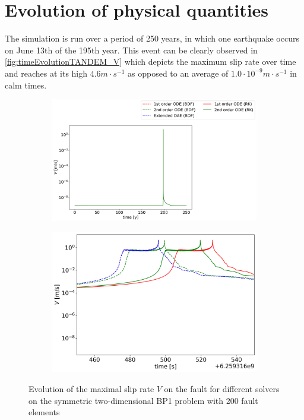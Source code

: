 \section{Evolution of physical quantities}
\label{sec:Results_EvolutionSlipRate}
The simulation is run over a period of 250 years, in which one earthquake occurs on June 13th of the 195th year. This event can be clearly observed in \autoref{fig:timeEvolutionTANDEM_V} which depicts the maximum slip rate over time and reaches at its high $4.6m\cdot s^{-1}$ as opposed to an average of $1.0 \cdot 10^{-9}m\cdot s^{-1}$ in calm times. 
\begin{figure}[H]
    \centering
    \begin{subfigure}[b]{0.45\textwidth}
     	\centering
    	\includegraphics[width=1.45\textwidth]{images/TANDEMtimeEvolution_2D_maxSlipRate_allFormulations.png}
    \end{subfigure} 
    \begin{subfigure}[b]{0.45\textwidth}
    	\centering
    	\includegraphics[width=1\textwidth]{images/TANDEMtimeEvolution_2D_maxSlipRate_allFormulations_Earthquake.png}
    \end{subfigure}
    \caption{Evolution of the maximal slip rate $V$ on the fault for different solvers on the symmetric two-dimensional BP1 problem with 200 fault elements}
    \label{fig:timeEvolutionTANDEM_V}
\end{figure}
